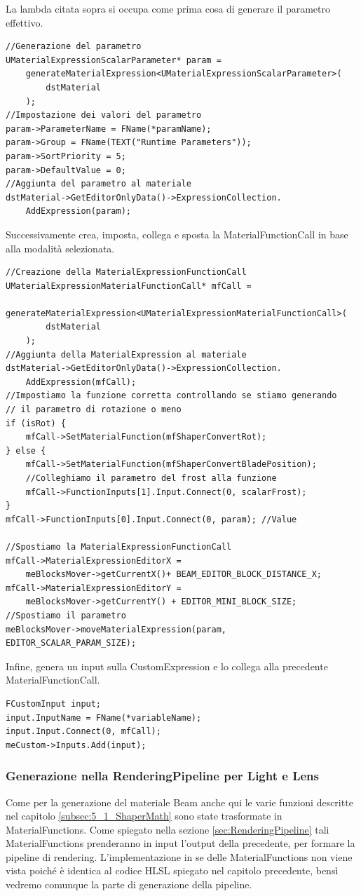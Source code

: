 \documentclass[main.tex]{subfiles}
\begin{document}
La lambda citata sopra si occupa come prima cosa di generare il parametro effettivo.
\begin{lstlisting}
//Generazione del parametro
UMaterialExpressionScalarParameter* param =
    generateMaterialExpression<UMaterialExpressionScalarParameter>(
        dstMaterial
    );
//Impostazione dei valori del parametro
param->ParameterName = FName(*paramName);
param->Group = FName(TEXT("Runtime Parameters"));
param->SortPriority = 5;
param->DefaultValue = 0;
//Aggiunta del parametro al materiale
dstMaterial->GetEditorOnlyData()->ExpressionCollection.
    AddExpression(param);
\end{lstlisting}
Successivamente crea, imposta, collega e sposta la MaterialFunctionCall in base alla modalità selezionata.
\begin{lstlisting}
//Creazione della MaterialExpressionFunctionCall
UMaterialExpressionMaterialFunctionCall* mfCall = 
    generateMaterialExpression<UMaterialExpressionMaterialFunctionCall>(
        dstMaterial
    );
//Aggiunta della MaterialExpression al materiale
dstMaterial->GetEditorOnlyData()->ExpressionCollection.
    AddExpression(mfCall);
//Impostiamo la funzione corretta controllando se stiamo generando 
// il parametro di rotazione o meno
if (isRot) {
    mfCall->SetMaterialFunction(mfShaperConvertRot);
} else {
    mfCall->SetMaterialFunction(mfShaperConvertBladePosition);
    //Colleghiamo il parametro del frost alla funzione
    mfCall->FunctionInputs[1].Input.Connect(0, scalarFrost);
}
mfCall->FunctionInputs[0].Input.Connect(0, param); //Value

//Spostiamo la MaterialExpressionFunctionCall
mfCall->MaterialExpressionEditorX =
    meBlocksMover->getCurrentX()+ BEAM_EDITOR_BLOCK_DISTANCE_X;
mfCall->MaterialExpressionEditorY =
    meBlocksMover->getCurrentY() + EDITOR_MINI_BLOCK_SIZE;
//Spostiamo il parametro
meBlocksMover->moveMaterialExpression(param, EDITOR_SCALAR_PARAM_SIZE);
\end{lstlisting}
Infine, genera un input sulla CustomExpression e lo collega alla precedente MaterialFunctionCall.
\begin{lstlisting}
FCustomInput input;
input.InputName = FName(*variableName);
input.Input.Connect(0, mfCall);
meCustom->Inputs.Add(input);
\end{lstlisting}

\subsubsection{Generazione nella RenderingPipeline per Light e Lens}\label{subsec:5_1_ShaperRenderingPipeline}
Come per la generazione del materiale Beam anche qui le varie funzioni descritte nel capitolo \ref{subsec:5_1_ShaperMath} sono state trasformate in MaterialFunctions. Come spiegato nella sezione \ref{sec:RenderingPipeline} tali MaterialFunctions prenderanno in input l'output della precedente, per formare la pipeline di rendering. L'implementazione in se delle MaterialFunctions non viene vista poiché è identica al codice HLSL spiegato nel capitolo precedente, bensì vedremo comunque la parte di generazione della pipeline. \newline
\end{document}
